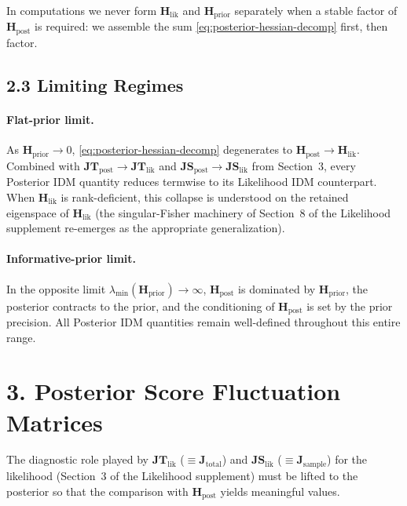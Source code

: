 \documentclass[11pt]{article}
\begin{document}
In computations we never form $\mathbf H_{\mathrm{lik}}$ and $\mathbf H_{\mathrm{prior}}$ separately when a stable factor of $\mathbf H_{\mathrm{post}}$ is required: we assemble the sum \eqref{eq:posterior-hessian-decomp} first, then factor.

\subsection*{2.3 Limiting Regimes}

\paragraph{Flat-prior limit.}
As $\mathbf H_{\mathrm{prior}} \to 0$, \eqref{eq:posterior-hessian-decomp} degenerates to $\mathbf H_{\mathrm{post}} \to \mathbf H_{\mathrm{lik}}$. Combined with $\mathbf{JT}_{\mathrm{post}} \to \mathbf{JT}_{\mathrm{lik}}$ and $\mathbf{JS}_{\mathrm{post}} \to \mathbf{JS}_{\mathrm{lik}}$ from Section~3, every Posterior IDM quantity reduces termwise to its Likelihood IDM counterpart. When $\mathbf H_{\mathrm{lik}}$ is rank-deficient, this collapse is understood on the retained eigenspace of $\mathbf H_{\mathrm{lik}}$ (the singular-Fisher machinery of Section~8 of the Likelihood supplement re-emerges as the appropriate generalization).

\paragraph{Informative-prior limit.}
In the opposite limit $\lambda_{\min}(\mathbf H_{\mathrm{prior}}) \to \infty$, $\mathbf H_{\mathrm{post}}$ is dominated by $\mathbf H_{\mathrm{prior}}$, the posterior contracts to the prior, and the conditioning of $\mathbf H_{\mathrm{post}}$ is set by the prior precision. All Posterior IDM quantities remain well-defined throughout this entire range.

\section*{3. Posterior Score Fluctuation Matrices}

The diagnostic role played by $\mathbf{JT}_{\mathrm{lik}}$ ($\equiv \mathbf J_{\mathrm{total}}$) and $\mathbf{JS}_{\mathrm{lik}}$ ($\equiv \mathbf J_{\mathrm{sample}}$) for the likelihood (Section~3 of the Likelihood supplement) must be lifted to the posterior so that the comparison with $\mathbf H_{\mathrm{post}}$ yields meaningful values.
\end{document}
